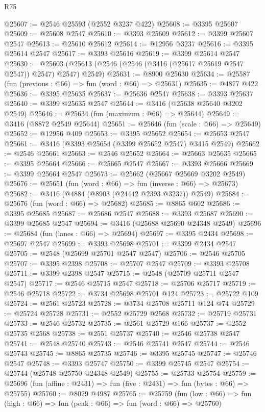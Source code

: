 \begin{lexlean}{R75}
\begin{coremodule}
@25607 := @2546 @25593 (@2552 @3237 @422)
@25608 := @3395 @25607
@25609 := @25608 @2547
@25610 := @3393 @25609
@25612 := @3399 @25607 @2547
@25613 := @25610 @25612
@25614 := @12956 @3237
@25616 := @3395 @25614 @2547
@25617 := @3393 @25616
@25619 := @3399 @25614 @2547
@25630 := @25603 (@25613 (@2546 (@2546 (@3416 (@25617 @25619 @2547 @2547)) @2547) @2547) @2549)
@25631 := @8900 @25630
@25634 := @25587 (fun (previous : @66) => fun (word : @66) => @25631)
@25635 := @4877 @422
@25636 := @3395 @25635
@25637 := @25636 @2547
@25638 := @3393 @25637
@25640 := @3399 @25635 @2547
@25644 := @3416 (@25638 @25640 @3202 @2549)
@25646 := @25634 (fun (maximum : @66) => @25644)
@25649 := @3416 (@8872 @2549 @25644)
@25651 := @25646 (fun (scale : @66) => @25649)
@25652 := @12956 @409
@25653 := @3395 @25652
@25654 := @25653 @2547
@25661 := @3416 (@3393 @25654 (@3399 @25652 @2547) @3415 @2549)
@25662 := @2546 @25661
@25663 := @2546 @25652
@25664 := @25663 @25635
@25665 := @3395 @25664
@25666 := @25665 @2547
@25667 := @3393 @25666
@25669 := @3399 @25664 @2547
@25673 := @25662 (@25667 @25669 @3202 @2549)
@25676 := @25651 (fun (word : @66) => fun (inverse : @66) => @25673)
@25682 := @3416 (@4884 (@8903 (@24442 @2393 @3237)) @2549)
@25684 := @25676 (fun (word : @66) => @25682)
@25685 := @8865 @602
@25686 := @3395 @25685
@25687 := @25686 @2547
@25688 := @3393 @25687
@25690 := @3399 @25685 @2547
@25694 := @3416 (@25688 @25690 @24348 @2549)
@25696 := @25684 (fun (lanes : @66) => @25694)
@25697 := @3395 @2434
@25698 := @25697 @2547
@25699 := @3393 @25698
@25701 := @3399 @2434 @2547
@25705 := @2548 (@25699 @25701 @2547 @2547)
@25706 := @2546 @25705
@25707 := @3395 @2398
@25708 := @25707 @2547
@25709 := @3393 @25708
@25711 := @3399 @2398 @2547
@25715 := @2548 (@25709 @25711 @2547 @2547)
@25717 := @2546 @25715 @2547
@25718 := @25706 @25717
@25719 := @2546 @25718
@25722 := @3734 @25698 @25701 @124
@25723 := @25722 @109
@25724 := @2561 @25723
@25728 := @3734 @25708 @25711 @124 @74
@25729 := @25724 @25728
@25731 := @2552 @25729 @2568
@25732 := @25719 @25731
@25733 := @2546 @25732
@25735 := @2561 @25729 @166
@25737 := @2552 @25735 @2568
@25738 := @2551 @25737
@25740 := @2546 @25738 @2547
@25741 := @2548 @25740
@25743 := @2546 @25741 @2547
@25744 := @2546 @25743
@25745 := @8865 @25735
@25746 := @3395 @25745
@25747 := @25746 @2547
@25748 := @3393 @25747
@25750 := @3399 @25745 @2547
@25754 := @25744 (@25748 @25750 @24348 @2549)
@25755 := @25733 @25754
@25759 := @25696 (fun (affine : @2431) => fun (five : @2431) => fun (bytes : @66) => @25755)
@25760 := @8029 @4987
@25765 := @25759
    (fun (low : @66) => fun (high : @66) => fun (peak : @66) => fun (word : @66) => @25760)

\end{coremodule}
\end{lexlean}

